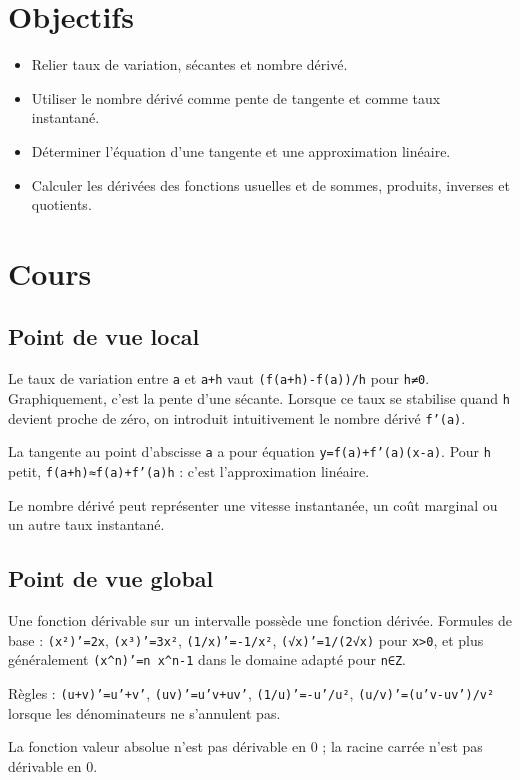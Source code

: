 \section{Objectifs}
\begin{itemize}
\item Relier taux de variation, sécantes et nombre dérivé.
\item Utiliser le nombre dérivé comme pente de tangente et comme taux instantané.
\item Déterminer l'équation d'une tangente et une approximation linéaire.
\item Calculer les dérivées des fonctions usuelles et de sommes, produits, inverses et quotients.
\end{itemize}

\section{Cours}
\subsection{Point de vue local}
Le taux de variation entre \texttt{a} et \texttt{a+h} vaut \texttt{(f(a+h)-f(a))/h} pour \texttt{h≠0}. Graphiquement, c'est la pente d'une sécante. Lorsque ce taux se stabilise quand \texttt{h} devient proche de zéro, on introduit intuitivement le nombre dérivé \texttt{f'(a)}.

La tangente au point d'abscisse \texttt{a} a pour équation \texttt{y=f(a)+f'(a)(x-a)}. Pour \texttt{h} petit, \texttt{f(a+h)≈f(a)+f'(a)h} : c'est l'approximation linéaire.

Le nombre dérivé peut représenter une vitesse instantanée, un coût marginal ou un autre taux instantané.

\subsection{Point de vue global}
Une fonction dérivable sur un intervalle possède une fonction dérivée. Formules de base : \texttt{(x²)'=2x}, \texttt{(x³)'=3x²}, \texttt{(1/x)'=-1/x²}, \texttt{(√x)'=1/(2√x)} pour \texttt{x>0}, et plus généralement \texttt{(x^n)'=n x^{n-1}} dans le domaine adapté pour \texttt{n∈Z}.

Règles : \texttt{(u+v)'=u'+v'}, \texttt{(uv)'=u'v+uv'}, \texttt{(1/u)'=-u'/u²}, \texttt{(u/v)'=(u'v-uv')/v²} lorsque les dénominateurs ne s'annulent pas.

La fonction valeur absolue n'est pas dérivable en 0 ; la racine carrée n'est pas dérivable en 0.

